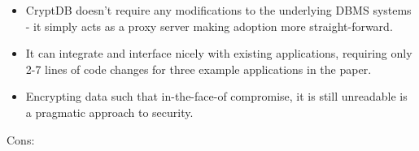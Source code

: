 \documentclass[11pt]{article}
\begin{document}
\begin{itemize}

    \item CryptDB doesn't require any modifications to the underlying DBMS
    systems - it simply acts as a proxy server making adoption more
    straight-forward.

    \item It can integrate and interface nicely with existing applications,
    requiring only 2-7 lines of code changes for three example applications in
    the paper.

    \item Encrypting data such that in-the-face-of compromise, it is still
    unreadable is a pragmatic approach to security.

\end{itemize}

Cons:
\end{document}

